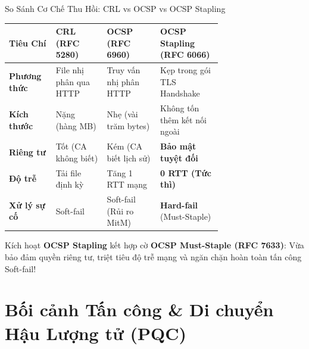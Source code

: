 \begin{frame}{So Sánh Cơ Chế Thu Hồi: CRL vs OCSP vs OCSP Stapling}
  \begin{table}[h]
    \centering\scriptsize
    \begin{tabularx}{\linewidth}{@{}p{0.22\linewidth} p{0.24\linewidth} p{0.25\linewidth} X@{}}
      \toprule
      \textbf{Tiêu Chí} & \textbf{CRL (RFC 5280)} & \textbf{OCSP (RFC 6960)} & \textbf{OCSP Stapling (RFC 6066)} \\
      \midrule
      \textbf{Phương thức} & File nhị phân qua HTTP & Truy vấn nhị phân HTTP & Kẹp trong gói TLS Handshake \\
      \textbf{Kích thước} & Nặng (hàng MB) & Nhẹ (vài trăm bytes) & Không tốn thêm kết nối ngoài \\
      \textbf{Riêng tư} & Tốt (CA không biết) & Kém (CA biết lịch sử) & \textbf{Bảo mật tuyệt đối} \\
      \textbf{Độ trễ} & Tải file định kỳ & Tăng 1 RTT mạng & \textbf{0 RTT (Tức thì)} \\
      \textbf{Xử lý sự cố} & Soft-fail & Soft-fail (Rủi ro MitM) & \textbf{Hard-fail} (Must-Staple) \\
      \bottomrule
    \end{tabularx}
  \end{table}

  \begin{keybox}
    Kích hoạt \textbf{OCSP Stapling} kết hợp cờ \textbf{OCSP Must-Staple (RFC 7633)}: Vừa bảo đảm quyền riêng tư, triệt tiêu độ trễ mạng và ngăn chặn hoàn toàn tấn công Soft-fail!
  \end{keybox}
\end{frame}

\section{Bối cảnh Tấn công \& Di chuyển Hậu Lượng tử (PQC)}

